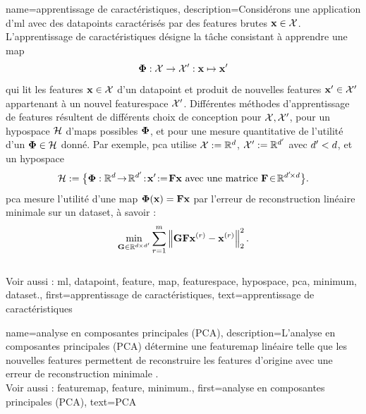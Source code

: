 {name={apprentissage de caractéristiques},
	description={Considérons une application d'\gls{ml} avec des \glspl{datapoint} caractérisés par 
		des \glspl{feature} brutes ${\bf x} \in \mathcal{X}$. L'apprentissage de caractéristiques 
		désigne la tâche consistant à apprendre une \gls{map}
		$$
		{\bf \Phi}: \mathcal{X} \rightarrow \mathcal{X}': {\bf x} \mapsto {\bf x}'
		$$ 
		qui lit les \glspl{feature} ${\bf x} \in \mathcal{X}$ d’un \gls{datapoint} et produit de 
		nouvelles \glspl{feature} ${\bf x}' \in \mathcal{X}'$ appartenant à un nouvel \gls{featurespace} $\mathcal{X}'$. 
		Différentes méthodes d'apprentissage de \glspl{feature} résultent de différents choix de conception pour 
		$\mathcal{X}, \mathcal{X}'$, pour un \gls{hypospace} $\mathcal{H}$ 
		d'\glspl{map} possibles ${\bf \Phi}$, et pour une mesure quantitative 
		de l’utilité d’un ${\bf \Phi} \in \mathcal{H}$ donné. Par exemple, \gls{pca} 
		utilise $\mathcal{X} := \mathbb{R}^{d}$, $\mathcal{X}' := \mathbb{R}^{d'}$ 
		avec $d' < d$, et un \gls{hypospace}
		$$
		\hypospace\defeq \big\{ \featuremapvec: \mathbb{R}^{\dimlocalmodel}
		\!\rightarrow\! \mathbb{R}^{\dimlocalmodel'}\!:\!\featurevec'\!\defeq\!\mF \featurevec \mbox{ avec une matrice } \mF \!\in\! \mathbb{R}^{\dimlocalmodel' \!\times \dimlocalmodel} \big\}.
		$$
		\gls{pca} mesure l'utilité d'une \gls{map} ${\bf \Phi}({\bf x})= \mathbf{F} {\bf x}$ 
		par l’erreur de reconstruction linéaire minimale sur un \gls{dataset}, à savoir :
		$$
		\min_{\mG \in \mathbb{R}^{\dimlocalmodel \!\!\!\times \dimlocalmodel'}} \sum_{\sampleidx=1}^{\samplesize} \normgeneric{\mG \mF \featurevec^{(\sampleidx)} - \featurevec^{(\sampleidx)}}{2}^{2}.
		$$
		\\
		Voir aussi : \gls{ml}, \gls{datapoint}, \gls{feature}, \gls{map}, \gls{featurespace}, \gls{hypospace}, \gls{pca}, \gls{minimum}, \gls{dataset}.},
	first={apprentissage de caractéristiques},
	text={apprentissage de caractéristiques}
}

{name={analyse en composantes principales (PCA)}, 
	description={L’analyse en composantes principales (PCA) 
		détermine une \gls{featuremap} linéaire telle que les nouvelles \glspl{feature} 
		permettent de reconstruire les \glspl{feature} d’origine avec une erreur de reconstruction minimale \cite{MLBasics}.
		\\
		Voir aussi : \gls{featuremap}, \gls{feature}, \gls{minimum}.},
	first={analyse en composantes principales (PCA)},
	text={PCA} 
}


